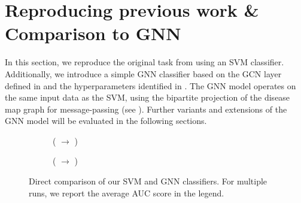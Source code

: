 \documentclass[
	fontsize=10pt, %
	twoside=false, %
	secnumdepth=1, %
  toc=indentunnumbered %
]{kaobook}
\begin{document}


\section{Reproducing previous work \& Comparison to GNN}
\label{sec:reproducing}

In this section, we reproduce the original task from \nielsen{} using an SVM
classifier. Additionally, we introduce a simple GNN classifier based on the
GCN layer defined in  and the hyperparameters identified
in . The GNN model operates on
the same input data as the SVM, using the bipartite projection of the disease
map graph for message-passing (see ). Further
variants and extensions of the GNN model will be evaluated in the following
sections.




%
\begin{figure}[h]
  \centering
  \begin{subfigure}[h]{0.49\linewidth}
    \caption{(\ADMap{} $\rightarrow$ \PDMap)}
  \end{subfigure}
  \begin{subfigure}[h]{0.49\linewidth}
    \caption{(\ADMap{} $\rightarrow$ \ReconMap)}
  \end{subfigure}
  \caption{Direct comparison of our SVM and GNN classifiers. For multiple runs,
    we report the average AUC score in the legend.}
  \label{fig:svm-repro-results}
\end{figure}
\end{document}
